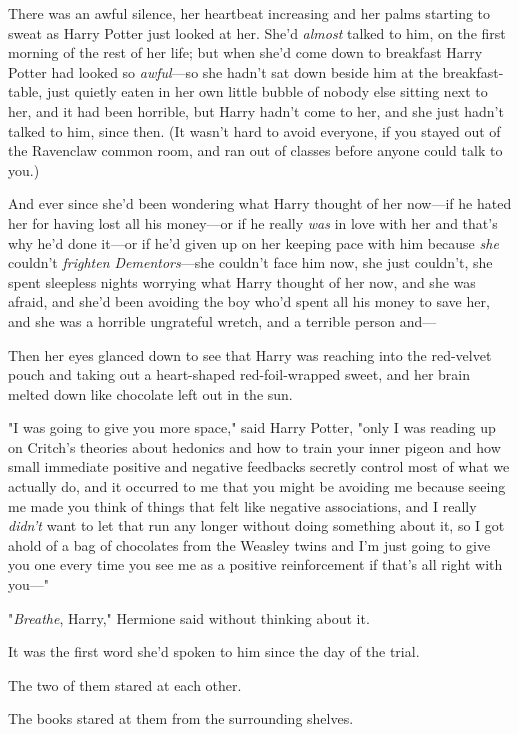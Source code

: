 There was an awful silence, her heartbeat increasing and her palms starting to
sweat as Harry Potter just looked at her. She'd \emph{almost} talked to him, on
the first morning of the rest of her life; but when she'd come down to
breakfast Harry Potter had looked so \emph{awful}---so she hadn't sat down
beside him at the breakfast-table, just quietly eaten in her own little bubble
of nobody else sitting next to her, and it had been horrible, but Harry hadn't
come to her, and{\el} she just hadn't talked to him, since then. (It wasn't
hard to avoid everyone, if you stayed out of the Ravenclaw common room, and ran
out of classes before anyone could talk to you.)

And ever since she'd been wondering what Harry thought of her now---if he hated
her for having lost all his money---or if he really \emph{was} in love with her
and that's why he'd done it---or if he'd given up on her keeping pace with him
because \emph{she} couldn't \emph{frighten Dementors}---she couldn't face him
now, she just couldn't, she spent sleepless nights worrying what Harry thought
of her now, and she was afraid, and she'd been avoiding the boy who'd spent all
his money to save her, and she was a horrible ungrateful wretch, and a terrible
person and---

Then her eyes glanced down to see that Harry was reaching into the red-velvet
pouch and taking out a heart-shaped red-foil-wrapped sweet, and her brain
melted down like chocolate left out in the sun.

"I was going to give you more space," said Harry Potter, "only I was reading up
on Critch's theories about hedonics and how to train your inner pigeon and how
small immediate positive and negative feedbacks secretly control most of what
we actually do, and it occurred to me that you might be avoiding me because
seeing me made you think of things that felt like negative associations, and I
really \emph{didn't} want to let that run any longer without doing something
about it, so I got ahold of a bag of chocolates from the Weasley twins and I'm
just going to give you one every time you see me as a positive reinforcement if
that's all right with you\mbox{---}"

"\emph{Breathe}, Harry," Hermione said without thinking about it.

It was the first word she'd spoken to him since the day of the trial.

The two of them stared at each other.

The books stared at them from the surrounding shelves.

